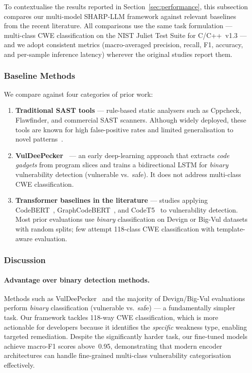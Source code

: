 \documentclass[conference]{IEEEtran}
\begin{document}
To contextualise the results reported in
Section~\ref{sec:performance}, this subsection compares our
multi-model SHARP-LLM framework against relevant baselines from the
recent literature.  All comparisons use the same task formulation ---
multi-class CWE classification on the NIST Juliet Test Suite for
C/C++~v1.3 --- and we adopt consistent metrics (macro-averaged
precision, recall, F1, accuracy, and per-sample inference latency)
wherever the original studies report them.

\subsubsection{Baseline Methods}
We compare against four categories of prior work:

\begin{enumerate}
    \item \textbf{Traditional SAST tools} --- rule-based static analysers
          such as Cppcheck, Flawfinder, and commercial SAST scanners.
          Although widely deployed, these tools are known for high
          false-positive rates and limited generalisation to novel
          patterns~\cite{johnson2013why}.
    \item \textbf{VulDeePecker~\cite{li2018vuldeepecker}} --- an early
          deep-learning approach that extracts \emph{code gadgets} from
          program slices and trains a bidirectional LSTM for
          \emph{binary} vulnerability detection (vulnerable vs.\ safe).
          It does not address multi-class CWE classification.
    \item \textbf{Transformer baselines in the literature} --- studies
          applying CodeBERT~\cite{feng2020codebert},
          GraphCodeBERT~\cite{guo2020graphcodebert}, and
          CodeT5~\cite{wang2021codet5} to vulnerability detection.
          Most prior evaluations use \emph{binary} classification on
          Devign or Big-Vul datasets with random splits; few attempt
          118-class CWE classification with template-aware evaluation.
\end{enumerate}

\subsubsection{Discussion}

\paragraph{Advantage over binary detection methods.}
Methods such as VulDeePecker~\cite{li2018vuldeepecker} and the majority
of Devign/Big-Vul evaluations perform \emph{binary} classification
(vulnerable vs.\ safe) --- a fundamentally simpler task.  Our framework
tackles 118-way CWE classification, which is more actionable for
developers because it identifies the \emph{specific} weakness type,
enabling targeted remediation.  Despite the significantly harder task,
our fine-tuned models achieve macro-F1 scores above~0.95, demonstrating
that modern encoder architectures can handle fine-grained
multi-class vulnerability categorisation effectively.
\end{document}
